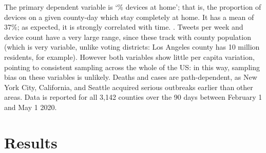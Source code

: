 \documentclass{article}
\begin{document}
The primary dependent variable is `\% devices at home'; that is, the proportion of devices on a given county-day which stay completely at home. It has a mean of 37\%; as expected, it is strongly correlated with time. . Tweets per week and device count have a very large range, since these track with county population (which is very variable, unlike voting districts: Los Angeles county has 10 million residents, for example). However both variables show little per capita variation, pointing to consistent sampling across the whole of the US: in this way, sampling bias on these variables is unlikely. Deaths and cases are path-dependent, as New York City, California, and Seattle acquired serious outbreaks earlier than other areas. Data is reported for all 3,142 counties over the 90 days between February 1 and May 1 2020. 


\section{Results}%
\end{document}
